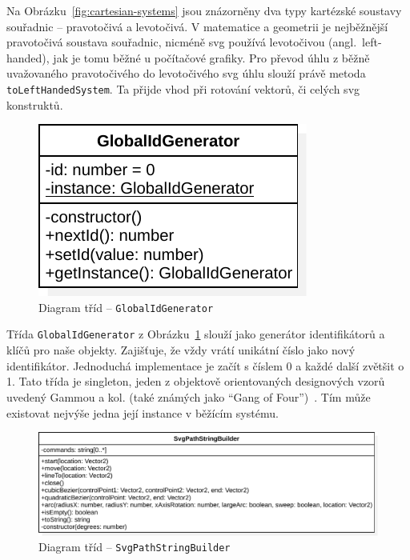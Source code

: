 Na Obrázku~\ref{fig:cartesian-systems} jsou znázorněny dva typy kartézské soustavy souřadnic -- pravotočivá a levotočivá.
V matematice a geometrii je nejběžnější pravotočivá soustava souřadnic, nicméně \acrshort{svg} používá levotočivou (angl.~left-handed), jak je tomu běžné u počítačové grafiky.
Pro převod úhlu z běžně uvažovaného pravotočivého do levotočivého \acrshort{svg} úhlu slouží právě metoda \texttt{toLeftHandedSystem}.
Ta přijde vhod při rotování vektorů, či celých \acrshort{svg} konstruktů.

\begin{figure}[!htb]
  \centering
  \includegraphics[width=\maxwidth{\textwidth}]{../img/diagrams/global-id-generator-class-diagram.pdf}
  \caption{Diagram tříd -- \texttt{GlobalIdGenerator}}
  \label{fig:global-id-gen-class-diagram}
\end{figure}

Třída \texttt{GlobalIdGenerator} z Obrázku~\ref{fig:global-id-gen-class-diagram} slouží jako generátor identifikátorů a klíčů pro naše objekty.
Zajišťuje, že vždy vrátí unikátní číslo jako nový identifikátor.
Jednoduchá implementace je začít s číslem 0 a každé další zvětšit o 1.
Tato třída je singleton, jeden z objektově orientovaných designových vzorů uvedený Gammou a kol. (také známých jako \enquote{Gang of Four})~\cite[s.~144]{gamma_designpatterns_1995}.
Tím může existovat nejvýše jedna její instance v běžícím systému.

\begin{figure}[!htb]
  \centering
  \includegraphics[width=\maxwidth{\textwidth}]{../img/diagrams/svg-path-string-builder-class-diagram.pdf}
  \caption{Diagram tříd -- \texttt{SvgPathStringBuilder}}
  \label{fig:svg-path-string-builder-class-diagram}
\end{figure}

